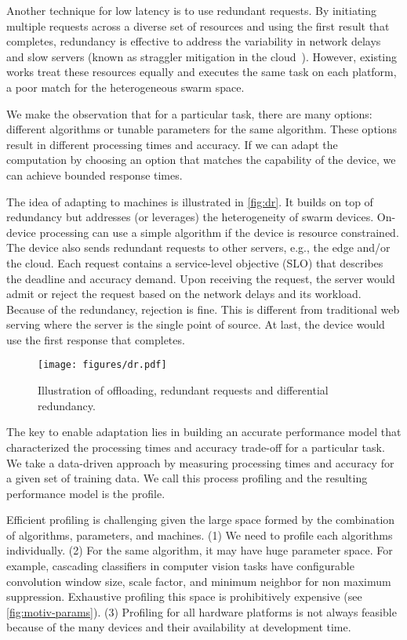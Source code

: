 Another technique for low latency is to use redundant requests. By initiating
multiple requests across a diverse set of resources and using the first result
that completes, redundancy is effective to address the variability in network
delays~\cite{gordon2015accelerating, vulimiri2013low} and slow servers (known as
straggler mitigation in the cloud~\cite{dean2013tail,
  ananthanarayanan2013effective}). However, existing works treat these resources
equally and executes the same task on each platform, a poor match for the
heterogeneous swarm space.

We make the observation that for a particular task, there are many options:
different algorithms or tunable parameters for the same algorithm. These options
result in different processing times and accuracy. If we can adapt the
computation by choosing an option that matches the capability of the device, we
can achieve bounded response times.

The idea of adapting to machines is illustrated in \autoref{fig:dr}. It builds
on top of redundancy but addresses (or leverages) the heterogeneity of swarm
devices.  On-device processing can use a simple algorithm if the device is
resource constrained. The device also sends redundant requests to other servers,
e.g., the edge and/or the cloud. Each request contains a service-level objective
(SLO) that describes the deadline and accuracy demand. Upon receiving the
request, the server would admit or reject the request based on the network
delays and its workload. Because of the redundancy, rejection is fine. This is
different from traditional web serving where the server is the single point of
source. At last, the device would use the first response that completes.

\begin{figure}
  \centering
  \texttt{[image: figures/dr.pdf]}
  \caption{Illustration of offloading, redundant requests and differential
    redundancy.}
  \label{fig:dr}
\end{figure}


The key to enable adaptation lies in building an accurate performance model that
characterized the processing times and accuracy trade-off for a particular
task. We take a data-driven approach by measuring processing times and accuracy
for a given set of training data. We call this process profiling and the
resulting performance model is the profile.

Efficient profiling is challenging given the large space formed by the
combination of algorithms, parameters, and machines. (1) We need to profile each
algorithms individually. (2) For the same algorithm, it may have huge parameter
space. For example, cascading classifiers in computer vision tasks have
configurable convolution window size, scale factor, and minimum neighbor for non
maximum suppression. Exhaustive profiling this space is prohibitively expensive
(see \autoref{fig:motiv-params}). (3) Profiling for all hardware platforms is
not always feasible because of the many devices and their availability at
development time.

